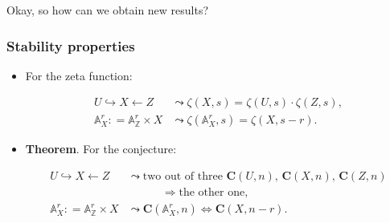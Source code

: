 \documentclass[handout]{beamer}
\newcommand{\ZZ}{\mathbb{Z}}
\renewcommand{\AA}{\mathbb{A}}
\newcommand{\dfn}{\mathrel{\mathop:}=}
\begin{document}

\begin{frame}[plain]
  \headingfont

  \vspace{\fill}

  \begin{center}
    {\huge Okay, so how can we obtain new results?}
  \end{center}

  \vspace{\fill}
\end{frame}


\begin{frame}
  \frametitle{Stability properties}

  \begin{itemize}
  \item<2-> For the zeta function:

    \begin{align*}
      U  \hookrightarrow X \leftarrow Z & \leadsto \zeta (X, s) = \zeta (U, s) \cdot \zeta (Z, s),\\
      \AA^r_X \dfn \AA_\ZZ^r \times X & \leadsto \zeta (\AA^r_X, s) = \zeta (X, s - r).
    \end{align*}

  \item<3-> \textbf{Theorem}. For the conjecture:

    \begin{align*}
      U  \hookrightarrow X \leftarrow Z & \leadsto \text{two out of three } \mathbf{C} (U, n), \, \mathbf{C} (X, n), \, \mathbf{C} (Z, n) \\
                                        & \quad\quad\quad\Longrightarrow \text{the other one},\\
      \AA^r_X \dfn \AA_\ZZ^r \times X & \leadsto \mathbf{C} (\AA^r_X, n) \iff \mathbf{C} (X, n - r).
    \end{align*}

  \end{itemize}
\end{frame}

\end{document}
